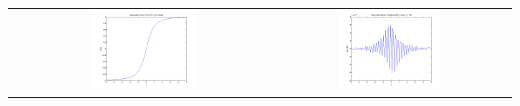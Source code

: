 \documentclass[11pt,a4paper,ngerman]{article}
\begin{document}
\begin{tabular}{l|cc}
& \includegraphics[width=0.45\textwidth]{plotE_TSCHEBY_100.png} & \includegraphics[width=0.45\textwidth]{fehlerTscheby_100.png} \\
\end{tabular}
\label{LastPage}
\end{document}
